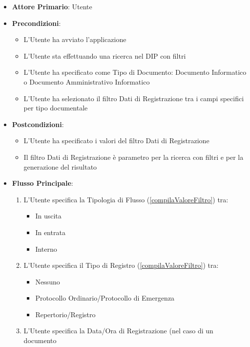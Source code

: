 \begin{itemize}
      \item \textbf{Attore Primario}: Utente
      \item \textbf{Precondizioni}: 
      \begin{itemize}
            \item L'Utente ha avviato l'applicazione
            \item L'Utente sta effettuando una ricerca nel DIP con filtri
            \item L'Utente ha specificato come Tipo di Documento: Documento Informatico o Documento Amministrativo Informatico
            \item L'Utente ha selezionato il filtro Dati di Registrazione tra i campi specifici per tipo documentale
      \end{itemize}
      \item \textbf{Postcondizioni}: 
      \begin{itemize}
            \item L'Utente ha specificato i valori del filtro Dati di Registrazione
            \item Il filtro Dati di Registrazione è parametro per la ricerca con filtri e per la generazione del risultato
      \end{itemize}
      \item \textbf{Flusso Principale}:
      \begin{enumerate}
            \item L'Utente specifica la Tipologia di Flusso (\ref{compilaValoreFiltro}) tra: \begin{itemize}
                  \item In uscita
                  \item In entrata
                  \item Interno
            \end{itemize}
            \item L'Utente specifica il Tipo di Registro (\ref{compilaValoreFiltro}) tra: 
            \begin{itemize}
                  \item Nessuno
                  \item Protocollo Ordinario/Protocollo di Emergenza
                  \item Repertorio/Registro
            \end{itemize}
            \item L'Utente specifica la Data/Ora di Registrazione (nel caso di un documento

\end{enumerate}
\end{itemize}
